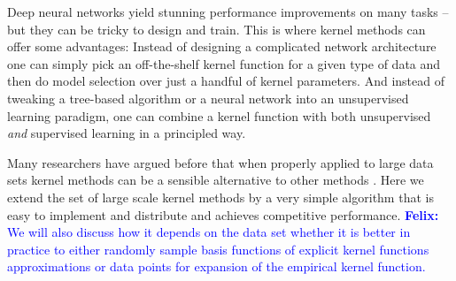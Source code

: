 \documentclass{article} %
\newcommand{\felix}[1]{\textcolor{blue}{{\bf Felix:} #1}}
\begin{document}

Deep neural networks yield stunning performance improvements on many tasks -- but they can be tricky to design and train.
This is where kernel methods can offer some advantages: Instead of designing a complicated network architecture one can simply pick an off-the-shelf kernel function for a given type of data and then do model selection over just a handful of kernel parameters. And instead of tweaking a tree-based algorithm or a neural network into an unsupervised learning paradigm, one can combine a kernel function with both unsupervised {\em and} supervised learning in a principled way.  

Many researchers have argued before that when properly applied to large data sets kernel methods can be a sensible alternative to other methods \cite{Lu2014}. Here we extend the set of large scale kernel methods by a very simple algorithm that is easy to implement and distribute and achieves competitive performance. 
\felix{We will also discuss how it depends on the data set whether it is better in practice to either randomly sample basis functions of explicit kernel functions approximations or data points for expansion of the empirical kernel function. }

\newpage



\end{document}
